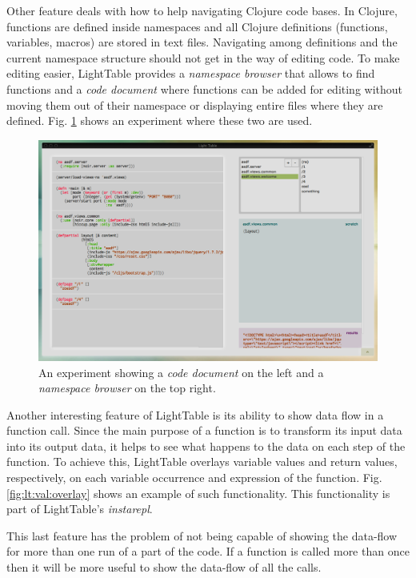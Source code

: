 Other feature deals with how to help navigating Clojure code bases.
In Clojure, functions are defined inside namespaces and all Clojure definitions (functions, variables, macros) are stored in text files.
Navigating among definitions and the current namespace structure should not get in the way of editing code.
To make editing easier, LightTable provides a \emph{namespace browser} that allows to find functions and a \emph{code document} where functions can be added for editing without moving them out of their namespace or displaying entire files where they are defined.
Fig. \ref{fig:lt:clojure:table} shows an experiment where these two are used.

\begin{figure}
  \centering
  \includegraphics[width=12cm]{./images/lt_clojure_table__inv}
  \caption{An experiment showing a \emph{code document} on the left and a \emph{namespace browser} on the top right.}
  \label{fig:lt:clojure:table}
\end{figure}

Another interesting feature of LightTable is its ability to show data flow in a function call.
Since the main purpose of a function is to transform its input data into its output data, it helps to see what happens to the data on each step of the function.
To achieve this, LightTable overlays variable values and return values, respectively, on each variable occurrence and expression of the function.
Fig. \ref{fig:lt:val:overlay} shows an example of such functionality.
This functionality is part of LightTable's \emph{instarepl}.

This last feature has the problem of not being capable of showing the data-flow for more than one run of a part of the code.
If a function is called more than once then it will be more useful to show the data-flow of all the calls.

